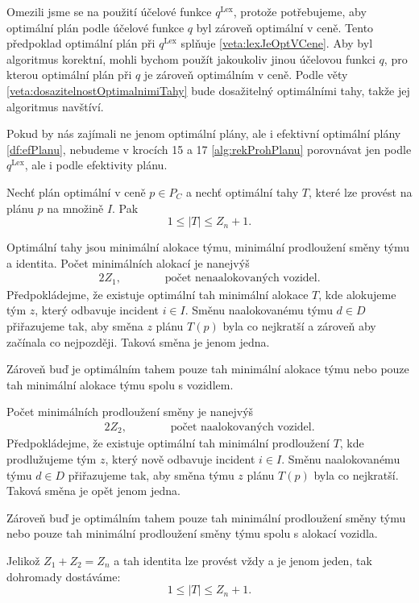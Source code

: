 Omezili jsme se na použití účelové funkce $q^{\text{Lex}}$, protože potřebujeme, aby optimální plán podle účelové funkce $q$ byl zároveň optimální v ceně.
Tento předpoklad optimální plán při $q^{\text{Lex}}$ splňuje \ref{veta:lexJeOptVCene}.
Aby byl algoritmus korektní, mohli bychom použít jakoukoliv jinou účelovou funkci $q$, pro kterou optimální plán při $q$ je zároveň optimálním v ceně.
Podle věty \ref{veta:dosazitelnostOptimalnimiTahy} bude dosažitelný optimálními tahy, takže jej algoritmus navštíví.

Pokud by nás zajímali ne jenom optimální plány, ale i efektivní optimální plány \ref{df:efPlanu},
nebudeme v krocích 15 a 17 \ref{alg:rekProhPlanu} porovnávat jen podle $q^{\text{Lex}}$, ale i podle efektivity plánu.

\begin{veta}\label{veta:pocetOptTahu}
  Nechť plán optimální v ceně $p \in P_C$ a nechť optimální tahy $T$, které lze provést na plánu $p$ na množině $I$.
  Pak
  \begin{equation*}
    1 \leq |T| \leq Z_n + 1.
  \end{equation*}
\end{veta}
\begin{dukaz}
  Optimální tahy jsou minimální alokace týmu, minimální prodloužení směny týmu a identita.
  Počet minimálních alokací je nanejvýš
  \begin{alignat*}{2}
    Z_1, \quad && \hspace{15pt} \text{počet nenaalokovaných vozidel.}
  \end{alignat*}
  Předpokládejme, že existuje optimální tah minimální alokace $T$, kde alokujeme tým $z$, který odbavuje incident $i \in I$.
  Směnu naalokovanému týmu $d \in D$ přiřazujeme tak, aby směna $z$ plánu $T(p)$ byla co nejkratší a zároveň aby začínala co nejpozději.
  Taková směna je jenom jedna.

  Zároveň buď je optimálním tahem pouze tah minimální alokace týmu nebo pouze tah minimální alokace týmu spolu s vozidlem.

  Počet minimálních prodloužení směny je nanejvýš
  \begin{alignat*}{2}
    Z_2, \quad && \hspace{15pt} \text{počet naalokovaných vozidel.}
  \end{alignat*}
  Předpokládejme, že existuje optimální tah minimální prodloužení $T$, kde prodlužujeme tým $z$, který nově odbavuje incident $i \in I$.
  Směnu naalokovanému týmu $d \in D$ přiřazujeme tak, aby směna týmu $z$ plánu $T(p)$ byla co nejkratší.
  Taková směna je opět jenom jedna.

  Zároveň buď je optimálním tahem pouze tah minimální prodloužení směny týmu nebo pouze tah minimální prodloužení směny týmu spolu s alokací vozidla.

  Jelikož $Z_1 + Z_2 = Z_n$ a tah identita lze provést vždy a je jenom jeden, tak dohromady dostáváme:
  \begin{equation*}
    1 \leq |T| \leq Z_n + 1.
  \end{equation*}
\end{dukaz}


